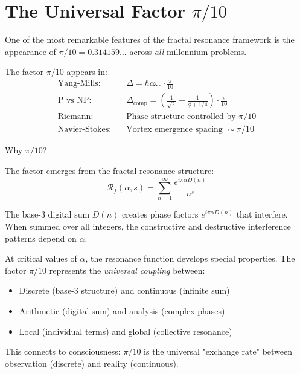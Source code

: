 \section{The Universal Factor \texorpdfstring{$\pi/10$}{pi/10}}

One of the most remarkable features of the fractal resonance framework is the appearance of $\pi/10 = 0.314159...$ across \textit{all} millennium problems.

\begin{theorem}\label{thm:universal-factor}
The factor $\pi/10$ appears in:
\begin{align}
\text{Yang-Mills:} \quad & \Delta = \hbar c \omega_c \cdot \frac{\pi}{10} \\
\text{P vs NP:} \quad & \Delta_{\text{comp}} = \left(\frac{1}{\sqrt{2}} - \frac{1}{\phi+1/4}\right) \cdot \frac{\pi}{10} \\
\text{Riemann:} \quad & \text{Phase structure controlled by } \pi/10 \\
\text{Navier-Stokes:} \quad & \text{Vortex emergence spacing } \sim \pi/10
\end{align}
\end{theorem}

\begin{keyidea}
Why $\pi/10$?

The factor emerges from the fractal resonance structure:
\begin{equation}
\mathcal{R}_f(\alpha, s) = \sum_{n=1}^{\infty} \frac{e^{i\pi\alpha D(n)}}{n^s}
\end{equation}

The base-3 digital sum $D(n)$ creates phase factors $e^{i\pi\alpha D(n)}$ that interfere. When summed over all integers, the constructive and destructive interference patterns depend on $\alpha$.

At critical values of $\alpha$, the resonance function develops special properties. The factor $\pi/10$ represents the \textit{universal coupling} between:
\begin{itemize}
\item Discrete (base-3 structure) and continuous (infinite sum)
\item Arithmetic (digital sum) and analysis (complex phases)
\item Local (individual terms) and global (collective resonance)
\end{itemize}

This connects to consciousness: $\pi/10$ is the universal "exchange rate" between observation (discrete) and reality (continuous).
\end{keyidea}

